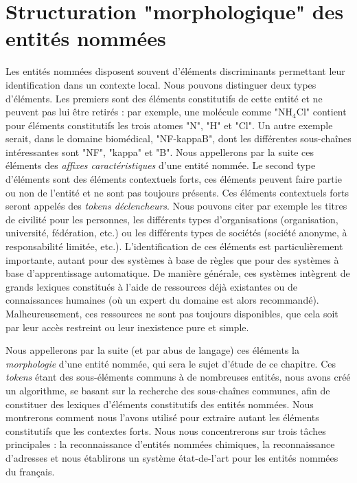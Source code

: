 \documentclass[12pt,a4paper,times,twoside,openright]{report}
\begin{document}
\chapter{Structuration "morphologique" des entités nommées}
\label{chap:morphology}
\minitoc
Les entités nommées disposent souvent d'éléments discriminants permettant leur identification dans un contexte local. Nous pouvons distinguer deux types d'éléments. Les premiers sont des éléments constitutifs de cette entité et ne peuvent pas lui être retirés : par exemple, une molécule comme "NH$_{4}$Cl" contient pour éléments constitutifs les trois atomes "N", "H" et "Cl". Un autre exemple serait, dans le domaine biomédical, "NF-kappaB", dont les différentes sous-chaînes intéressantes sont "NF", "kappa" et "B". Nous appellerons par la suite ces éléments des \emph{affixes caractéristiques} d'une entité nommée. Le second type d'éléments sont des éléments contextuels forts, ces éléments peuvent faire partie ou non de l'entité et ne sont pas toujours présents. Ces éléments contextuels forts seront appelés des \emph{tokens déclencheurs}. Nous pouvons citer par exemple les titres de civilité pour les personnes, les différents types d'organisations (organisation, université, fédération, etc.) ou les différents types de sociétés (société anonyme, à responsabilité limitée, etc.). L'identification de ces éléments est particulièrement importante, autant pour des systèmes à base de règles que pour des systèmes à base d'apprentissage automatique. De manière générale, ces systèmes intègrent de grands lexiques constitués à l'aide de ressources déjà existantes ou de connaissances humaines (où un expert du domaine est alors recommandé). Malheureusement, ces ressources ne sont pas toujours disponibles, que cela soit par leur accès restreint ou leur inexistence pure et simple.

Nous appellerons par la suite (et par abus de langage) ces éléments la \emph{morphologie} d'une entité nommée, qui sera le sujet d'étude de ce chapitre. Ces \emph{tokens} étant des sous-éléments communs à de nombreuses entités, nous avons créé un algorithme, se basant sur la recherche des sous-chaînes communes, afin de constituer des lexiques d'éléments constitutifs des entités nommées. Nous montrerons comment nous l'avons utilisé pour extraire autant les éléments constitutifs que les contextes forts. Nous nous concentrerons sur trois tâches principales : la reconnaissance d'entités nommées chimiques, la reconnaissance d'adresses et nous établirons un système état-de-l'art pour les entités nommées du français.
\end{document}
